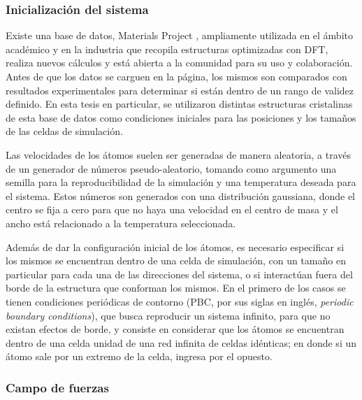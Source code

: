 \subsubsection{Inicialización del sistema}

Existe una base de datos, Materials Project \cite{materials_project}, 
ampliamente utilizada en el ámbito académico y en la industria que 
recopila estructuras optimizadas con DFT, realiza nuevos cálculos y 
está abierta a la comunidad para su uso y colaboración. Antes de que 
los datos se carguen en la página, los mismos son comparados con resultados 
experimentales para determinar si están dentro de un rango de validez definido. 
En esta tesis en particular, se utilizaron distintas estructuras cristalinas de 
esta base de datos como condiciones iniciales para las posiciones y los tamaños 
de las celdas de simulación.

Las velocidades de los átomos suelen ser generadas de manera aleatoria, a través
de un generador de números pseudo-aleatorio, tomando como argumento una semilla 
para la reproducibilidad de la simulación y una temperatura deseada para el
sistema. Estos números son generados con una distribución gaussiana, donde el 
centro se fija a cero para que no haya una velocidad en el centro de masa y 
el ancho está relacionado a la temperatura seleccionada.

Además de dar la configuración inicial de los átomos, es necesario especificar si
los mismos se encuentran dentro de una celda de simulación, con un tamaño en
particular para cada una de las direcciones del sistema, o si %
interactúan fuera
del borde de la estructura que conforman los mismos. En el primero de los casos
se tienen condiciones periódicas de contorno (PBC, por sus siglas en inglés, 
\textit{periodic boundary conditions}), que busca reproducir un sistema infinito,
para que no existan efectos de borde, y consiste en considerar que los átomos se 
encuentran dentro de una celda unidad de una red infinita de celdas idénticas; en
donde si un átomo sale por un extremo de la celda, ingresa por el opuesto.


\subsubsection{Campo de fuerzas}

